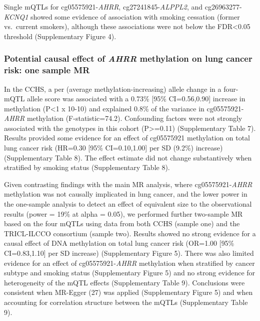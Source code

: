 \documentclass[11pt,twoside]{bristolthesis}
\begin{document}
Single mQTLs for cg05575921-\emph{AHRR}, cg27241845-\emph{ALPPL2}, and cg26963277-\emph{KCNQ1} showed some evidence of association with smoking cessation (former vs.~current smokers), although these associations were not below the FDR\textless0.05 threshold (Supplementary Figure 4).

\hypertarget{potential-causal-effect-of-ahrr-methylation-on-lung-cancer-risk-one-sample-mr}{%
\subsubsection{\texorpdfstring{Potential causal effect of \emph{AHRR} methylation on lung cancer risk: one sample MR}{Potential causal effect of AHRR methylation on lung cancer risk: one sample MR}}\label{potential-causal-effect-of-ahrr-methylation-on-lung-cancer-risk-one-sample-mr}}

In the CCHS, a per (average methylation-increasing) allele change in a four-mQTL allele score was associated with a 0.73\% {[}95\% CI=0.56,0.90{]} increase in methylation (P\textless1 x 10-10) and explained 0.8\% of the variance in cg05575921-\emph{AHRR} methylation (F-statistic=74.2). Confounding factors were not strongly associated with the genotypes in this cohort (P\textgreater=0.11) (Supplementary Table 7). Results provided some evidence for an effect of cg05575921 methylation on total lung cancer risk (HR=0.30 {[}95\% CI=0.10,1.00{]} per SD (9.2\%) increase) (Supplementary Table 8). The effect estimate did not change substantively when stratified by smoking status (Supplementary Table 8).

Given contrasting findings with the main MR analysis, where cg05575921-\emph{AHRR} methylation was not causally implicated in lung cancer, and the lower power in the one-sample analysis to detect an effect of equivalent size to the observational results (power = 19\% at alpha = 0.05), we performed further two-sample MR based on the four mQTLs using data from both CCHS (sample one) and the TRICL-ILCCO consortium (sample two). Results showed no strong evidence for a causal effect of DNA methylation on total lung cancer risk (OR=1.00 {[}95\% CI=0.83,1.10{]} per SD increase) (Supplementary Figure 5). There was also limited evidence for an effect of cg05575921-\emph{AHRR} methylation when stratified by cancer subtype and smoking status (Supplementary Figure 5) and no strong evidence for heterogeneity of the mQTL effects (Supplementary Table 9). Conclusions were consistent when MR-Egger (27) was applied (Supplementary Figure 5) and when accounting for correlation structure between the mQTLs (Supplementary Table 9).
\end{document}
